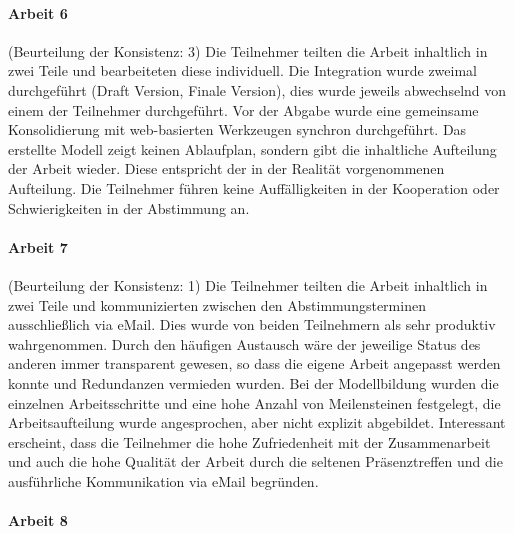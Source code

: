 
\paragraph{Arbeit 6} %
\label{par:arbeit_6}

(Beurteilung der Konsistenz: 3) Die Teilnehmer teilten die Arbeit inhaltlich in zwei Teile und bearbeiteten diese individuell. Die Integration wurde zweimal durchgeführt (Draft Version, Finale Version), dies wurde jeweils abwechselnd von einem der Teilnehmer durchgeführt. Vor der Abgabe wurde eine gemeinsame Konsolidierung mit web-basierten Werkzeugen synchron durchgeführt. Das erstellte Modell zeigt keinen Ablaufplan, sondern gibt die inhaltliche Aufteilung der Arbeit wieder. Diese entspricht der in der Realität vorgenommenen Aufteilung. Die Teilnehmer führen keine Auffälligkeiten in der Kooperation oder Schwierigkeiten in der Abstimmung an.


\paragraph{Arbeit 7} %
\label{par:arbeit_7}

(Beurteilung der Konsistenz: 1) Die Teilnehmer teilten die Arbeit inhaltlich in zwei Teile und kommunizierten zwischen den Abstimmungsterminen ausschließlich via eMail. Dies wurde von beiden Teilnehmern als sehr produktiv wahrgenommen. Durch den häufigen Austausch wäre der jeweilige Status des anderen immer transparent gewesen, so dass die eigene Arbeit angepasst werden konnte und Redundanzen vermieden wurden. Bei der Modellbildung wurden die einzelnen Arbeitsschritte und eine hohe Anzahl von Meilensteinen festgelegt, die Arbeitsaufteilung wurde angesprochen, aber nicht explizit abgebildet. Interessant erscheint, dass die Teilnehmer die hohe Zufriedenheit mit der Zusammenarbeit und auch die hohe Qualität der Arbeit durch die seltenen Präsenztreffen und die ausführliche Kommunikation via eMail begründen.


\paragraph{Arbeit 8} %
\label{par:arbeit_8}

